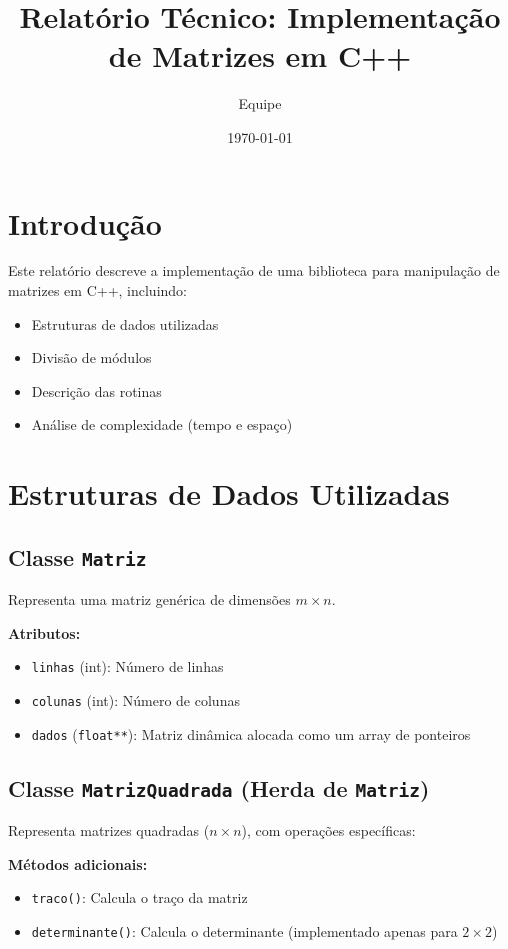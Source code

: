 \documentclass{article}
\title{Relatório Técnico: Implementação 
de Matrizes em C++}
\author{Equipe}
\date{\today}
\begin{document}
\maketitle

\section{Introdução}
Este relatório descreve a implementação de uma biblioteca para manipulação de matrizes em C++, incluindo:
\begin{itemize}
    \item Estruturas de dados utilizadas
    \item Divisão de módulos
    \item Descrição das rotinas
    \item Análise de complexidade (tempo e espaço)
\end{itemize}

\section{Estruturas de Dados Utilizadas}

\subsection{Classe \texttt{Matriz}}
Representa uma matriz genérica de dimensões $m \times n$.

\textbf{Atributos:}
\begin{itemize}
    \item \texttt{linhas} (int): Número de linhas
    \item \texttt{colunas} (int): Número de colunas
    \item \texttt{dados} (\texttt{float**}): Matriz dinâmica alocada como um array de ponteiros
\end{itemize}

\subsection{Classe \texttt{MatrizQuadrada} (Herda de \texttt{Matriz})}
Representa matrizes quadradas ($n \times n$), com operações específicas:

\textbf{Métodos adicionais:}
\begin{itemize}
    \item \texttt{traco()}: Calcula o traço da matriz
    \item \texttt{determinante()}: Calcula o determinante (implementado apenas para $2\times2$)
\end{itemize}
\end{document}
